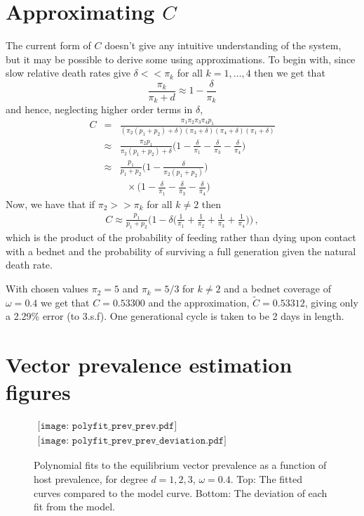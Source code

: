 \documentclass[5p,times]{elsarticle}
\begin{document}
\section{Approximating $C$}    %
The current form of $C$ doesn't give any intuitive understanding of the system, but it may be possible to derive some using approximations. To begin with, since slow relative death rates give $\delta<<\pi_k$ for all $k=1,\dots,4$ then we get that
\begin{equation}
\frac{\pi_k}{\pi_k+d} \approx 1 - \frac{\delta}{\pi_k}
\end{equation}
and hence, neglecting higher order terms in $\delta$,
\begin{eqnarray}
C &=& \frac{\pi_1\pi_2\pi_3\pi_4p_1}{(\pi_2(p_1+p_2)+\delta)(\pi_3+\delta)(\pi_4+\delta)(\pi_1+\delta)} \\
&\approx& \frac{\pi_2p_1}{\pi_2(p_1+p_2)+\delta}\Big(1-\frac{\delta}{\pi_1}-\frac{\delta}{\pi_3}-\frac{\delta}{\pi_4}\Big)\\
&\approx& \frac{p_1}{p_1+p_2} \Big(1-\frac{\delta}{\pi_2(p_1+p_2)}\Big)\\&& \mbox{ }\times \Big(1-\frac{\delta}{\pi_1}-\frac{\delta}{\pi_3}-\frac{\delta}{\pi_4}\Big)
\end{eqnarray}
Now, we have that if $\pi_2>>\pi_k$ for all $k\neq 2$ then
\begin{eqnarray}
C \approx \frac{p_1}{p_1+p_2}\Big(1-\delta\Big(\frac{1}{\pi_1} + \frac{1}{\pi_2} +\frac{1}{\pi_3} + \frac{1}{\pi_4}\Big)\Big)\,,
\end{eqnarray}
which is the product of the probability of feeding rather than dying upon contact with a bednet and the probability of surviving a full generation given the natural death rate.

With chosen values $\pi_2 = 5$ and $\pi_k=5/3$ for $k\neq 2$ and a bednet coverage of $\omega=0.4$ we get that $C=0.53300$ and the approximation, $\tilde{C}=0.53312$, giving only a 2.29\% error (to 3.s.f). One generational cycle is taken to be 2 days in length.

\section{Vector prevalence estimation figures}

\begin{figure}[h]
\begin{center}$
\begin{array}{c}
\texttt{[image: polyfit\_prev\_prev.pdf]}\\
\texttt{[image: polyfit\_prev\_prev\_deviation.pdf]}
\end{array}$
\caption{Polynomial fits to the equilibrium vector prevalence as a function of host prevalence, for degree $d=1,2,3$, $\omega=0.4$. Top: The fitted curves compared to the model curve. Bottom: The deviation of each fit from the model.}
\label{fig:polyfit}
\end{center}
\end{figure}

%


\end{document}
